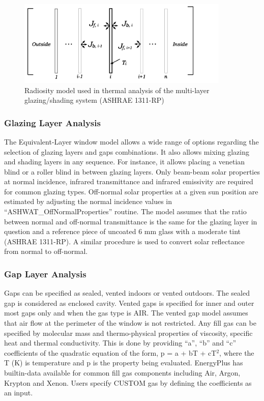\begin{figure}[hbtp] %
\centering
\includegraphics[width=0.9\textwidth, height=0.9\textheight, keepaspectratio=true]{media/image1831.svg.png}
\caption{Radiosity model used in thermal analysis of the multi-layer glazing/shading system (ASHRAE 1311-RP) \protect \label{fig:radiosity-model-used-in-thermal-analysis-of}}
\end{figure}

\subsubsection{Glazing Layer Analysis}\label{glazing-layer-analysis}

The Equivalent-Layer window model allows a wide range of options regarding the selection of glazing layers and gaps combinations. It also allows mixing glazing and shading layers in any sequence. For instance, it allows placing a venetian blind or a roller blind in between glazing layers. Only beam-beam solar properties at normal incidence, infrared transmittance and infrared emissivity are required for common glazing types. Off-normal solar properties at a given sun position are estimated by adjusting the normal incidence values in ``ASHWAT\_OffNormalProperties'' routine. The model assumes that the ratio between normal and off-normal transmittance is the same for the glazing layer in question and a reference piece of uncoated 6 mm glass with a moderate tint (ASHRAE 1311-RP). A similar procedure is used to convert solar reflectance from normal to off-normal.

\subsubsection{Gap Layer Analysis}\label{gap-layer-analysis}

Gaps can be specified as sealed, vented indoors or vented outdoors. The sealed gap is considered as enclosed cavity. Vented gaps is specified for inner and outer most gaps only and when the gas type is AIR. The vented gap model assumes that air flow at the perimeter of the window is not restricted. Any fill gas can be specified by molecular mass and thermo-physical properties of viscosity, specific heat and thermal conductivity. This is done by providing ``a'', ``b'' and ``c'' coefficients of the quadratic equation of the form, p = a + bT + cT\(^{2}\), where the T (K) is temperature and p is the property being evaluated. EnergyPlus has builtin-data available for common fill gas components including Air, Argon, Krypton and Xenon. Users specify CUSTOM gas by defining the coefficients as an input.

